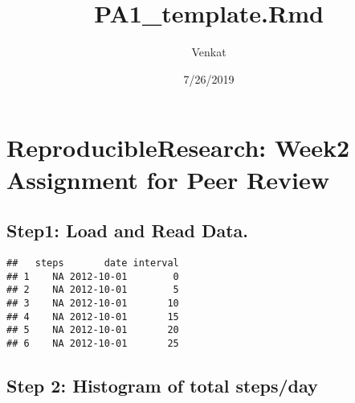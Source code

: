 \documentclass[]{article}
\title{PA1\_template.Rmd}
\author{Venkat}
\date{7/26/2019}
\newenvironment{Shaded}{\begin{snugshade}}{\end{snugshade}}
\newcommand{\CommentTok}[1]{\textcolor[rgb]{0.56,0.35,0.01}{\textit{#1}}}
\newcommand{\DataTypeTok}[1]{\textcolor[rgb]{0.13,0.29,0.53}{#1}}
\newcommand{\KeywordTok}[1]{\textcolor[rgb]{0.13,0.29,0.53}{\textbf{#1}}}
\newcommand{\NormalTok}[1]{#1}
\newcommand{\OtherTok}[1]{\textcolor[rgb]{0.56,0.35,0.01}{#1}}
\newcommand{\StringTok}[1]{\textcolor[rgb]{0.31,0.60,0.02}{#1}}
\begin{document}
\maketitle

\hypertarget{reproducibleresearch-week2-assignment-for-peer-review}{%
\section{ReproducibleResearch: Week2 Assignment for Peer
Review}\label{reproducibleresearch-week2-assignment-for-peer-review}}

\hypertarget{step1-load-and-read-data.}{%
\subsection{Step1: Load and Read
Data.}\label{step1-load-and-read-data.}}

\begin{Shaded}
\end{Shaded}

\begin{verbatim}
##   steps       date interval
## 1    NA 2012-10-01        0
## 2    NA 2012-10-01        5
## 3    NA 2012-10-01       10
## 4    NA 2012-10-01       15
## 5    NA 2012-10-01       20
## 6    NA 2012-10-01       25
\end{verbatim}

\hypertarget{step-2-histogram-of-total-stepsday}{%
\subsection{Step 2: Histogram of total
steps/day}\label{step-2-histogram-of-total-stepsday}}
\end{document}
